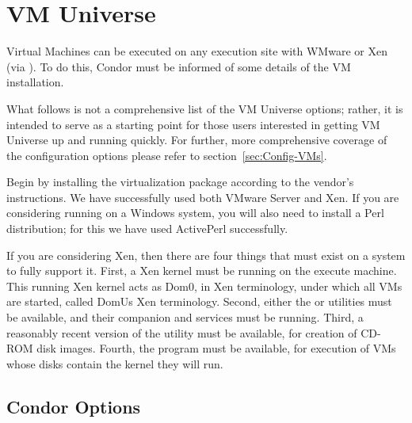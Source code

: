 \section{\label{sec:vm-install}VM Universe}



Virtual Machines can be executed on any execution site with WMware or Xen
(via ).  To do this, Condor must be informed of some details 
of the VM installation.

What follows is not a comprehensive list of the VM Universe options; rather,
it is intended to serve as a starting point for those users interested in
getting VM Universe up and running quickly.  For further, more comprehensive 
coverage of the configuration options please refer to 
section~\ref{sec:Config-VMs}.

Begin by installing the virtualization package according to the vendor's
instructions.  We have successfully used both VMware Server and Xen. If you
are considering running on a Windows system, you will also need to install
a Perl distribution; for this we have used ActivePerl successfully. 

If you are considering Xen, then there are four things that must exist on 
a system to fully support it. First, a Xen kernel must be running on the 
execute machine. This running Xen kernel acts as Dom0, in Xen terminology, 
under which all VMs are started, called DomUs Xen terminology. Second, 
either the  or  utilities must be available, and their 
companion  and  services must be running. Third, a 
reasonably recent version of the  utility must be available, 
for creation of CD-ROM disk images. Fourth, the  program must be 
available, for execution of VMs whose disks contain the kernel they will run.

\subsection{Condor Options}

